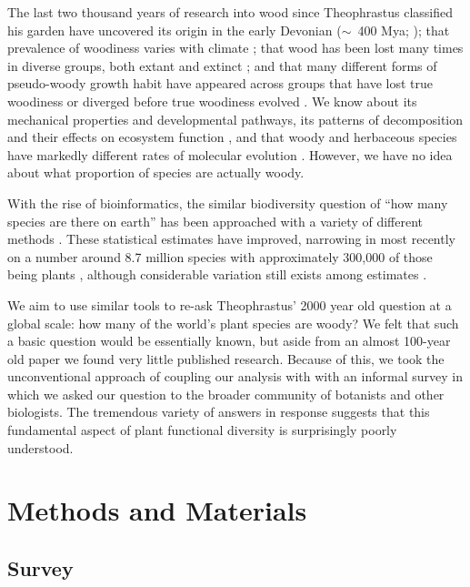 \documentclass[a4paper,12pt]{article}
\begin{document}
The last two thousand years of research into wood since Theophrastus
classified his garden have uncovered its origin in the early Devonian
($\sim$~400 Mya; \citealt{gerrienne2011simple}); that prevalence of
woodiness varies with climate \citep{Molesheihgt}; that wood has been
lost many times in diverse groups, both extant and extinct
\citep{judd1994}; and that many different forms of pseudo-woody growth
habit have appeared across groups that have lost true woodiness or
diverged before true woodiness evolved \citep{Cornwellwood}.  We know
about its mechanical properties and developmental pathways, its
patterns of decomposition and their effects on ecosystem function
\citep{Cornwellwood}, and that woody and herbaceous species have
markedly different rates of molecular evolution \citep{SmithDonoghue}.
%
However, we have no idea about what proportion of species are actually
woody.

With the rise of bioinformatics, the similar biodiversity question of
``how many species are there on earth'' has been approached with a
variety of different methods \citep{may1988many,erwin1991many,
  stork1993many, joppa2010, costello2011, mora2011plos}.  These
statistical estimates have improved, narrowing in most recently on a
number around 8.7 million species with approximately 300,000 of those
being plants \citep{mora2011plos}, although considerable variation
still exists among estimates \citep{costello2011}.

We aim to use similar tools to re-ask Theophrastus' 2000 year old
question at a global scale: how many of the world's plant species are
woody?
%
We felt that such a basic question would be essentially known, but
aside from an almost 100-year old paper \citep{sinnott1915evolution}
we found very little published research.
%
Because of this, we took the unconventional approach of coupling our
analysis with with an informal survey in which we asked our question
to the broader community of botanists and other biologists.
% 
The tremendous variety of answers in response suggests that this
fundamental aspect of plant functional diversity is surprisingly
poorly understood.

\section{Methods and Materials}

\subsection{Survey}
\end{document}
